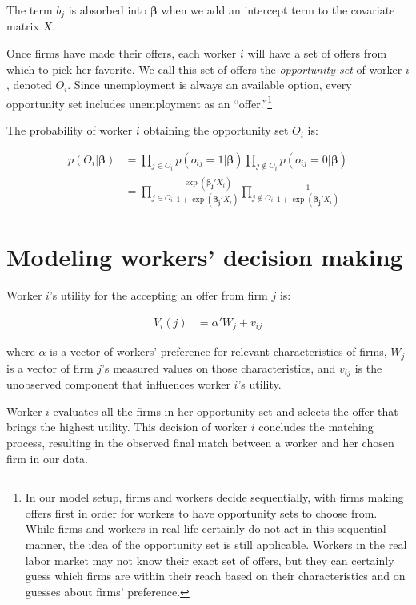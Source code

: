 The term $b_j$ is absorbed into $\bm{\beta}$ when we add an intercept term to
the covariate matrix $X$.

Once firms have made their offers, each worker $i$ will have a set of offers
from which to pick her favorite. We call this set of offers the
\textit{opportunity set} of worker $i$, denoted $O_i$. Since unemployment is
always an available option, every opportunity set includes unemployment as an
``offer.''\footnote{In our model setup, firms and workers decide sequentially,
  with firms making offers first in order for workers to have opportunity sets
  to choose from. While firms and workers in real life certainly do not act in
  this sequential manner, the idea of the opportunity set is still applicable.
  Workers in the real labor market may not know their exact set of offers, but
  they can certainly guess which firms are within their reach based on their
  characteristics and on guesses about firms' preference.}

The probability of worker $i$ obtaining the opportunity set $O_i$ is:

\begin{align}
  p(O_i | \bm{\beta}) &= \prod_{j \in O_i} p(o_{ij} = 1 | \bm{\beta}) \prod_{j \notin O_i} p(o_{ij} = 0 | \bm{\beta}) \\
                      &= \prod_{j \in O_i} \frac{\exp(\bm{\beta_j} ' X_i)}{1 + \exp(\bm{\beta_j}' X_i)}
                        \prod_{j \notin O_i} \frac{1}{1 + \exp(\bm{\beta_j}' X_i)} \label{eq:conditional_probability_of_offer}
\end{align}

\section{Modeling workers' decision making}

Worker $i$'s utility for the accepting an offer from firm $j$ is:

\begin{align}
  V_i(j) &= \alpha' W_{j} + v_{ij}
\end{align}

where $\alpha$ is a vector of workers' preference for relevant characteristics
of firms, $W_j$ is a vector of firm $j$'s measured values on those
characteristics, and $v_{ij}$ is the unobserved component that influences worker
$i$'s utility.

Worker $i$ evaluates all the firms in her opportunity set and selects the offer
that brings the highest utility. This decision of worker $i$ concludes the
matching process, resulting in the observed final match between a worker and her
chosen firm in our data.

